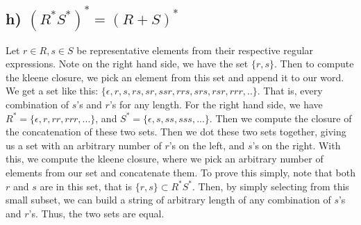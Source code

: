 \documentclass[20pt]{article} %
\begin{document}
\subsection{h) $(R^{*}S^{*})^{*}=(R+S)^{*}$}
Let $r \in R, s \in S$ be representative elements from their respective regular expressions.  Note on the right hand side, we have the set $\{r,s\}$.  Then to compute the kleene closure, we pick an element from this set and append it to our word.  We get a set like this: $\{\epsilon, r, s, rs, sr, ssr, rrs, srs, rsr, rrr, ..\}$. That is, every combination of $s$'s and $r$'s for any length. For the right hand side, we have $R^{*} = \{\epsilon, r, rr, rrr, ...\}$, and $S^{*} = \{\epsilon, s, ss, sss, ...\}$. Then we compute the closure of the concatenation of these two sets. Then we dot these two sets together, giving us a set with an arbitrary number of $r$'s on the left, and $s$'s on the right.  With this, we compute the kleene closure, where we pick an arbitrary number of elements from our set and concatenate them.  To prove this simply, note that both $r$ and $s$ are in this set, that is $\{r,s\} \subset R^{*}S^{*}$. Then, by simply selecting from this small subset, we can build a string of arbitrary length of any combination of $s$'s and $r$'s.  Thus, the two sets are equal.
\end{document}
